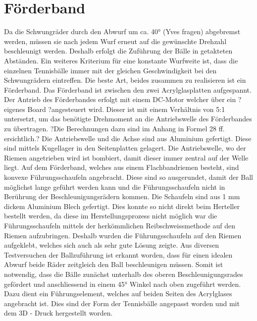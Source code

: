 \section{Förderband}
Da die Schwungräder durch den Abwurf um ca. 40° (Yves fragen) abgebremst werden, müssen sie nach jedem Wurf erneut auf die gewünschte Drehzahl beschleunigt werden. Deshalb erfolgt die Zuführung der Bälle in getakteten Abständen. Ein weiteres Kriterium für eine konstante Wurfweite ist, dass die einzelnen Tennisbälle immer mit der gleichen Geschwindigkeit bei den Schwungrädern eintreffen. Die beste Art, beides zusammen zu realisieren ist ein Förderband. Das Förderband ist zwischen den zwei Acrylglasplatten aufgespannt. Der Antrieb des Förderbandes erfolgt mit einem DC-Motor welcher über ein ?eigenes Board ?angesteuert wird. Dieser ist mit einem Verhältnis von  5:1 untersetzt, um das benötigte Drehmoment an die Antriebswelle des Förderbandes zu übertragen. ?Die Berechnungen dazu sind im Anhang in Formel 28 ff. ersichtlich.? Die Antriebswelle und die Achse sind aus Aluminium gefertigt. Diese sind mittels Kugellager in den Seitenplatten gelagert. Die Antriebswelle, wo der Riemen angetrieben wird ist bombiert, damit dieser immer zentral auf der Welle liegt. Auf dem Förderband, welches aus einem Flachbandriemen besteht, sind konvexe Führungsschaufeln angebracht. Diese sind so ausgerundet, damit der Ball möglichst lange geführt werden kann und die Führungsschaufeln nicht in Berührung der Beschleunigungsrädern kommen. Die Schaufeln sind aus 1 mm dickem Aluminium Blech gefertigt. Dies konnte so nicht direkt beim Herteller bestellt werden, da diese im Herstellungsprozess nicht möglich war die Führungsschaufeln mittels der herkömmlichen Reibschweissmethode auf den Riemen aufzubringen. Deshalb wurden die Führungsschaufeln auf den Riemen aufgeklebt, welches sich auch als sehr gute Lösung zeigte. Aus diversen Testversuchen der Ballzuführung ist erkannt worden, dass für einen idealen Abwurf beide Räder zeitgleich den Ball beschleunigen müssen. Somit ist notwendig, dass die Bälle zunächst unterhalb des oberen Beschleunigungsrades gefördert und anschliessend in einem 45° Winkel nach oben zugeführt werden. Dazu dient ein Führungselement, welches auf beiden Seiten des Acrylglases angebracht ist. Dies sind der Form der Tennisbälle angepasst worden und mit dem 3D - Druck hergestellt worden.


